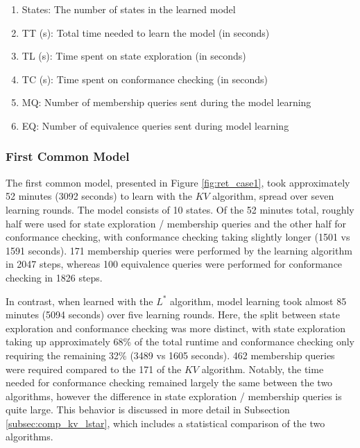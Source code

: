\begin{enumerate}
	\item States: The number of states in the learned model
	\item TT (s): Total time needed to learn the model (in seconds)
	\item TL (s): Time spent on state exploration (in seconds)
	\item TC (s): Time spent on conformance checking (in seconds)
	\item MQ: Number of membership queries sent during the model learning
	\item EQ: Number of equivalence queries sent during model learning
\end{enumerate}
 

\subsubsection*{First Common Model}

The first common model, presented in Figure \ref{fig:ret_case1}, took approximately 52 minutes (3092 seconds) to learn with the $KV$ algorithm, spread over seven learning rounds. The model consists of 10 states. Of the 52 minutes total, roughly half were used for state exploration / membership queries and the other half for conformance checking, with conformance checking taking slightly longer (1501 vs 1591 seconds). 171 membership queries were performed by the learning algorithm in 2047 steps, whereas 100 equivalence queries were performed for conformance checking in 1826 steps.

In contrast, when learned with the $L^*$ algorithm, model learning took almost 85 minutes (5094 seconds) over five learning rounds. Here, the split between state exploration and conformance checking was more distinct, with state exploration taking up approximately 68\% of the total runtime and conformance checking only requiring the remaining 32\% (3489 vs 1605 seconds). 462 membership queries were required compared to the 171 of the $KV$ algorithm. Notably, the time needed for conformance checking remained largely the same between the two algorithms, however the difference in state exploration / membership queries is quite large. This behavior is discussed in more detail in Subsection \ref{subsec:comp_kv_lstar}, which includes a statistical comparison of the two algorithms.

